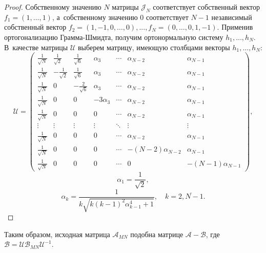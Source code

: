 \begin{proof}
    Собственному значению \( N \) матрицы \( \mathcal{J}_N \) 
    соответствует собственный вектор \( f_1 = {\left(1,\ldots,1\right)} \),
        а~собственному значению \( 0 \) соответствует \( N-1 \) независимый собственный вектор
        \( f_2 = {\left(1,-1,0,\ldots,0\right)}, ...,
           f_N = {\left(0,\ldots,0,1,-1\right)} \).
    Применив ортогонализацию Грамма-Шмидта, получим ортонормальную систему \( h_1, \ldots, h_N \).
    В~качестве матрицы \( \mathcal{U} \) выберем матрицу,
    имеющую столбцами векторы \( h_1, \ldots, h_N \):
    \[ \mathcal{U} =
    \begin{pmatrix}
        \frac{1}{\sqrt N} &  \frac{1}{\sqrt2} &  \frac{1}{\sqrt{6}} &   \alpha_3 & \cdots & \alpha_{N-2}     & \alpha_{N-1} \\
        \frac{1}{\sqrt N} & -\frac{1}{\sqrt2} &  \frac{1}{\sqrt{6}} &   \alpha_3 & \cdots & \alpha_{N-2}     & \alpha_{N-1} \\
        \frac{1}{\sqrt N} & 0                 & -\frac{2}{\sqrt{6}} &   \alpha_3 & \cdots & \alpha_{N-2}     & \alpha_{N-1} \\
        \frac{1}{\sqrt N} & 0                 &  0                  & -3\alpha_3 & \cdots & \alpha_{N-2}     & \alpha_{N-1} \\
        \frac{1}{\sqrt N} & 0                 &  0                  & 0          & \cdots & \alpha_{N-2}     & \alpha_{N-1} \\
        \vdots            & \vdots            &  \vdots             & \vdots     & \ddots & \vdots           & \vdots  \\
        \frac{1}{\sqrt N} & 0                 &  0                  & 0          & \cdots & \alpha_{N-2}     & \alpha_{N-1} \\
        \frac{1}{\sqrt N} & 0                 &  0                  & 0          & \cdots & -(N-2)\alpha_{N-2} & \alpha_{N-1} \\
        \frac{1}{\sqrt N} & 0                 &  0                  & 0          & \cdots & 0                  & -(N-1)\alpha_{N-1}
    \end{pmatrix},\]
    \[
        \alpha_1 = \frac{1}{\sqrt{2}}, \]
    \[
        \alpha_k = \frac{1}{k\sqrt{k(k-1)^2 \alpha_{k-1}^4 + 1}}, \quad k=\overline{2,N-1}.\]
\end{proof}

Таким образом, исходная матрица \( \mathcal{A}_{MN} \) подобна матрице
\( \mathcal{A} - \mathcal{B} \), где \( \mathcal{B} = \mathcal{U} \mathscr{B}_{MN} \mathcal{U}^{-1} \).
